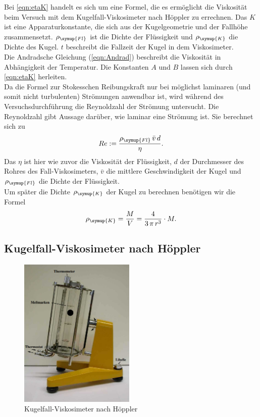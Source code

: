     Bei \autoref{eqn:etaK} handelt es sich um eine Formel, die es ermöglicht die Viskosität beim Versuch mit dem Kugelfall-Viskosimeter nach Höppler zu errechnen.
    Das $K$ ist eine Apparaturkonstante, die sich aus der Kugelgeometrie und der Fallhöhe zusammensetzt. $\rho_{\symup{Fl}}$ ist die Dichte der Flüssigkeit und $\rho_{\symup{K}}$ die Dichte
    des Kugel. $t$ beschreibt die Fallzeit der Kugel in dem Viskosimeter.\\
    Die Andradsche Gleichung (\ref{eqn:Andrad}) beschreibt die Viskosität in Abhängigkeit der Temperatur. Die Konstanten $A$ und $B$ lassen sich durch \autoref{eqn:etaK}
    herleiten.\\
    Da die Formel zur Stokesschen Reibungskraft nur bei möglichst laminaren (und somit nicht turbulenten) Strömungen anwendbar ist, wird während des Versuchsdurchführung die
    Reynoldzahl der Strömung untersucht. Die Reynoldzahl gibt Aussage darüber, wie laminar eine Strömung ist. Sie berechnet sich zu
    \begin{equation}
        \label{eqn:Reynoldzahl}
        Re := \frac{\rho_{\symup{Fl}}\,\bar{v}\,d}{\eta}.
    \end{equation}
    Das $\eta$ ist hier wie zuvor die Viskosität der Flüssigkeit, $d$ der Durchmesser des Rohres des Fall-Viskosimeters, $\bar{v}$ die mittlere Geschwindigkeit der Kugel und
    $\rho_{\symup{Fl}}$ die Dichte der Flüssigkeit.\\
    Um später die Dichte $\rho_{\symup{K}}$ der Kugel zu berechnen benötigen wir die Formel
    \begin{equation}
        \label{eqn:KugelDichte}
        \rho_{\symup{K}} = \frac{M}{V} = \frac{4}{3 \,\pi \, r^3} \cdot M.
    \end{equation}

\subsection{Kugelfall-Viskosimeter nach Höppler}

\begin{figure}
    \centering
    \includegraphics[width=5.5cm]{Kugelfall.png}
    \caption{Kugelfall-Viskosimeter nach Höppler \cite{anleitung107}}
    \label{Abb:Kugelfall}
\end{figure}

